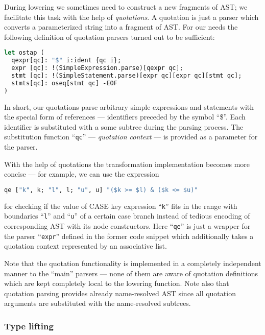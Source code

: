 During lowering we sometimes need to construct a new fragments of AST; we facilitate this task
with the help of \emph{quotations}. A quotation is just a parser which converts a parameterized 
string into a fragment of AST. For our needs the following definition of quotation parsers turned out 
to be sufficient:

\begin{lstlisting}[language=ocaml]
let ostap (
  qexpr[qc]: "$" i:ident {qc i};
  expr [qc]: !(SimpleExpression.parse)[qexpr qc];
  stmt [qc]: !(SimpleStatement.parse)[expr qc][expr qc][stmt qc];
  stmts[qc]: oseq[stmt qc] -EOF
)
\end{lstlisting}

In short, our quotations parse arbitrary simple expressions and statements with the special form of
references --- identifiers preceded by the symbol ``\$''. Each identifier is substituted with a
some subtree during the parsing process. The substitution function ``\lstinline{qc}'' --- 
\emph{quotation context} --- is provided as a parameter for the parser. 

With the help of quotations the transformation implementation becomes more concise --- for example, 
we can use the expression

\begin{lstlisting}[language=ocaml]
   qe ["k", k; "l", l; "u", u] "($k >= $l) & ($k <= $u)"
\end{lstlisting}

for checking if the value of CASE key expression ``\lstinline{k}'' fits in the range with boundaries
``\lstinline{l}'' and ``\lstinline{u}'' of a certain case branch instead of tedious encoding of corresponding 
AST with its node constructors. Here ``\lstinline{qe}'' is just a wrapper for the parser ``\lstinline{expr}''
defined in the former code snippet which additionally takes a quotation context represented by an associative 
list.

Note that the quotation functionality is implemented in a completely independent manner to the ``main'' parsers ---
none of them are aware of quotation definitions which are kept completely local to the lowering function. Note also
that quotation parsing provides already name-resolved AST since all quotation arguments are substituted with 
the name-resolved subtrees.

\subsubsection{Type lifting}

